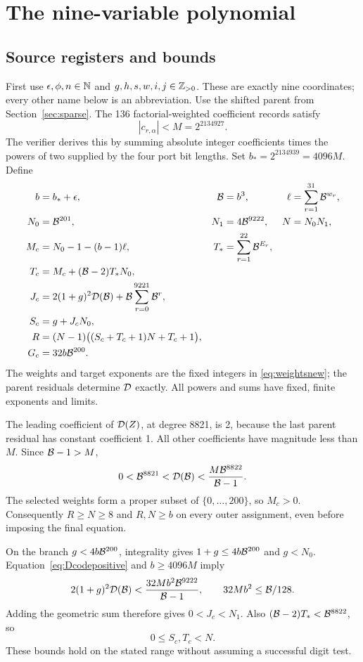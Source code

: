 \section{The nine-variable polynomial}\label{sec:nine}

\subsection{Source registers and bounds}
First use $\epsilon,\phi,n\in\mathbb N$ and $g,h,s,w,i,j\in\mathbb Z_{>0}$.
These are exactly nine coordinates; every other name below is an
abbreviation. Use the shifted parent from Section~\ref{sec:sparse}.
The 136 factorial-weighted coefficient records satisfy
\[
 |c_{r,\alpha}|<M=2^{2134927}.
\]
The verifier derives this by summing absolute integer coefficients times
the powers of two supplied by the four port bit lengths. Set
$b_*=2^{2134939}=4096M$. Define
\begin{align*}
 b&=b_*+\epsilon,& \mathcal B&=b^3,&
 \ell&=\sum_{r=1}^{31}\mathcal B^{w_r},\\
 N_0&=\mathcal B^{201},&N_1&=4\mathcal B^{9222},&N&=N_0N_1,\\
 M_c&=N_0-1-(b-1)\ell,&
 T_*&=\sum_{r=1}^{22}\mathcal B^{E_r},\\
 T_c&=M_c+(\mathcal B-2)T_*N_0,\\
 J_c&=2(1+g)^2\mathcal D(\mathcal B)+\mathcal B\sum_{r=0}^{9221}\mathcal B^r,\\
 S_c&=g+J_cN_0,\\
 R&=(N-1)\bigl((S_c+T_c+1)N+T_c+1\bigr),\\
 G_c&=32b\mathcal B^{200}.
\end{align*}
The weights and target exponents are the fixed integers in
\eqref{eq:weightsnew}; the parent residuals determine $\mathcal D$ exactly.
All powers and sums have fixed, finite exponents and limits.

The leading coefficient of $\mathcal D(Z)$, at degree 8821, is 2, because
the last parent residual has constant coefficient 1. All other
coefficients have magnitude less than $M$. Since $\mathcal B-1>M$,
\begin{equation}\label{eq:Dcodepositive}
 0<\mathcal B^{8821}<\mathcal D(\mathcal B)
 <\frac{M\mathcal B^{8822}}{\mathcal B-1}.
\end{equation}
The selected weights form a proper subset of $\{0,\ldots,200\}$,
so $M_c>0$. Consequently $R\ge N\ge8$ and $R,N\ge b$ on every
outer assignment, even before imposing the final equation.

On the branch $g<4b\mathcal B^{200}$, integrality gives
$1+g\le4b\mathcal B^{200}$ and $g<N_0$. Equation~\eqref{eq:Dcodepositive}
and $b\ge4096M$ imply
\[
2(1+g)^2\mathcal D(\mathcal B)
 <\frac{32Mb^2\mathcal B^{9222}}{\mathcal B-1},\qquad
32Mb^2\le\mathcal B/128.
\]
Adding the geometric sum therefore gives $0<J_c<N_1$.
Also $(\mathcal B-2)T_*<\mathcal B^{8822}$, so
\begin{equation}\label{eq:boundedsource}
0\le S_c,T_c<N.
\end{equation}
These bounds hold on the stated range without assuming a successful
digit test.

